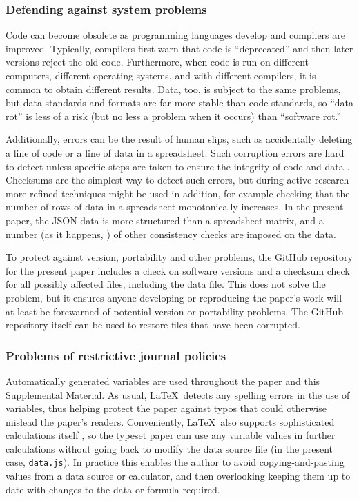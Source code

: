 \documentclass[10pt,a4paper]{article}
\def\supplement{Supplemental Material}
\begin{document}
\subsubsection{Defending against system problems}
Code can become obsolete as programming languages develop and compilers are improved. Typically, compilers first warn that code is ``deprecated'' and then later versions reject the old code. Furthermore, when code is run on different computers, different operating systems, and with different compilers, it is common to obtain different results. Data, too, is subject to the same problems, but data standards and formats are far more stable than code standards, so ``data rot'' is less of a risk (but no less a problem when it occurs) than ``software rot.''

Additionally, errors can be the result of human slips, such as accidentally deleting a line of code or a line of data in a spreadsheet. Such corruption errors are hard to detect unless specific steps are taken to ensure the integrity of code and data \cite{excel-fiasco}. Checksums are the simplest way to detect such errors, but during active research more refined techniques might be used in addition, for example checking that the number of rows of data in a spreadsheet monotonically increases. In the present paper, the JSON data is more structured than a spreadsheet matrix, and a number (as it happens, \the\JSONerrorCount) of other consistency checks are imposed on the data.

To protect against version, portability and other problems, the GitHub repository for the present paper includes a check on software versions and a checksum check for all possibly affected files, including the data file. This does not solve the problem, but it ensures anyone developing or reproducing the paper's work will at least be forewarned of potential version or portability problems. The GitHub repository itself can be used to restore files that have been corrupted.

\subsubsection{Problems of restrictive journal policies}
\label{supplement-restrictive-policies}
Automatically generated variables are used throughout the paper and this \supplement.
As usual, \LaTeX\ detects any spelling errors in the use of variables, thus helping protect the paper against typos that could otherwise mislead the paper's readers. Conveniently, \LaTeX\ also supports sophisticated calculations itself \cite{latex-calculus}, so the typeset paper can use any variable values in further calculations without going back to modify the data source file (in the present case, \texttt{data.js}). In practice this enables the author to avoid copying-and-pasting values from a data source or calculator, and then overlooking keeping them up to date with changes to the data or formula required.
\end{document}
